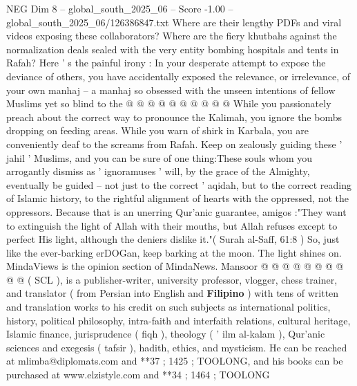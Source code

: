 \begin{textsample}{NEG Dim 8 – global\_south\_2025\_06 – Score -1.00 – global\_south\_2025\_06/126386847.txt}
Where are their lengthy PDFs and viral videos exposing these collaborators?
Where are the fiery khutbahs against the normalization deals sealed with the very entity bombing hospitals and tents in Rafah?
Here ' s the painful irony : In your desperate attempt to expose the deviance of others, you have accidentally exposed the relevance, or irrelevance, of your own manhaj -- a manhaj so obsessed with the unseen intentions of fellow Muslims yet so blind to the @ @ @ @ @ @ @ @ @ @ While you passionately preach about the correct way to pronounce the Kalimah, you ignore the bombs dropping on feeding areas.
While you warn of shirk in Karbala, you are conveniently deaf to the screams from Rafah.
Keep on zealously guiding these ' jahil ' Muslims, and you can be sure of one thing:These souls whom you arrogantly dismiss as ' ignoramuses ' will, by the grace of the Almighty, eventually be guided -- not just to the correct ' aqidah, but to the correct reading of Islamic history, to the rightful alignment of hearts with the oppressed, not the oppressors.
Because that is an unerring Qur'anic guarantee, amigos :"They want to extinguish the light of Allah with their mouths, but Allah refuses except to perfect His light, although the deniers dislike it."( Surah al-Saff, 61:8 ) So, just like the ever-barking erDOGan, keep barking at the moon.
The light shines on.
MindaViews is the opinion section of MindaNews.
Mansoor @ @ @ @ @ @ @ @ @ @ ( SCL ), is a publisher-writer, university professor, vlogger, chess trainer, and translator ( from Persian into English and \textbf{Filipino} ) with tens of written and translation works to his credit on such subjects as international politics, history, political philosophy, intra-faith and interfaith relations, cultural heritage, Islamic finance, jurisprudence ( fiqh ), theology ( ' ilm al-kalam ), Qur'anic sciences and exegesis ( tafsir ), hadith, ethics, and mysticism.
He can be reached at mlimba@diplomats.com and **37 ; 1425 ; TOOLONG, and his books can be purchased at www.elzistyle.com and **34 ; 1464 ; TOOLONG

\end{textsample}
